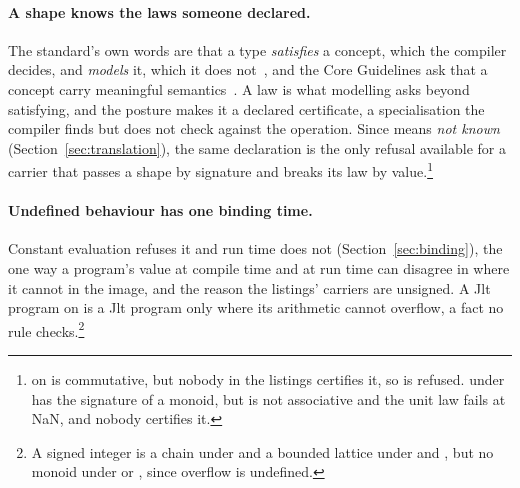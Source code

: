 \paragraph{A shape knows the laws someone declared.}
The standard's own words are that a type \emph{satisfies} a concept, which the compiler decides, and \emph{models} it, which it does not~\cite[{\texttt{res.on.requirements}}]{cpp23standard}, and the Core Guidelines ask that a concept carry meaningful semantics~\cite[T.20]{cppcoreguidelines}.
A law is what modelling asks beyond satisfying, and the posture makes it a declared certificate, a specialisation the compiler finds but does not check against the operation.
Since  means \emph{not known} (Section~\ref{sec:translation}), the same declaration is the only refusal available for a carrier that passes a shape by signature and breaks its law by value.\footnote{\cppinline{*} on  is commutative, but nobody in the listings certifies it, so  is refused.
 under \cppinline{+} has the signature of a monoid, but \cppinline{+} is not associative and the unit law fails at NaN, and nobody certifies it.}

\paragraph{Undefined behaviour has one binding time.}
Constant evaluation refuses it and run time does not (Section~\ref{sec:binding}), the one way a program's value at compile time and at run time can disagree in \Cpp{} where it cannot in the image, and the reason the listings' carriers are unsigned.
A Jlt program on  is a Jlt program only where its arithmetic cannot overflow, a fact no rule checks.\footnote{A signed integer is a chain under \cppinline{<} and a bounded lattice under  and , but no monoid under \cppinline{+} or \cppinline{*}, since overflow is undefined.}

